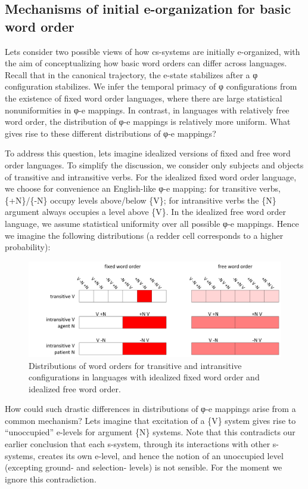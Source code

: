 \subsection{Mechanisms of initial e-organization for basic word order}

Lets consider two possible views of how cs-systems are initially e-organized, with the aim of conceptualizing how basic word orders can differ across languages. Recall that in the canonical trajectory, the e-state stabilizes after a φ configuration stabilizes. We infer the temporal primacy of φ configurations from the existence of fixed word order languages, where there are large statistical nonuniformities in φ-e mappings. In contrast, in languages with relatively free word order, the distribution of φ-e mappings is relatively more uniform. What gives rise to these different distributions of φ-e mappings?

  To address this question, lets imagine idealized versions of fixed and free word order languages. To simplify the discussion, we consider only subjects and objects of transitive and intransitive verbs. For the idealized fixed word order language, we choose for convenience an English-like φ-e mapping: for transitive verbs, \{+N\}/\{-N\} occupy levels above/below \{V\}; for intransitive verbs the \{N\} argument always occupies a level above \{V\}. In the idealized free word order language, we assume statistical uniformity over all possible φ-e mappings. Hence we imagine the following distributions (a redder cell corresponds to a higher probability):

  
\begin{figure}
\includegraphics[width=\textwidth]{figures/Tilsen-img74.png}
\caption{Distributions of word orders for transitive and intransitive configurations in languages with idealized fixed word order and idealized free word order.}
\label{fig:4:24}
\end{figure}
 

  How could such drastic differences in distributions of φ{}-e mappings arise from a common mechanism? Lets imagine that excitation of a \{V\} system gives rise to “unoccupied” e-levels for argument \{N\} systems. Note that this contradicts our earlier conclusion that each s-system, through its interactions with other s-systems, creates its own e-level, and hence the notion of an unoccupied level (excepting ground- and selection- levels) is not sensible. For the moment we ignore this contradiction.

